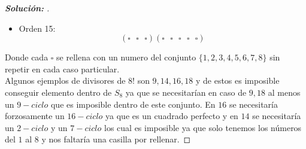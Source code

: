 \documentclass[12pt]{article}
\begin{document}
\begin{enumerate}
\begin{proof}[\textbf{Solución: }]
\begin{itemize}
    \item Orden 15:
    $$(\square\textbf{ }\square\textbf{ }\square)(\square\textbf{ }\square\textbf{ }\square\textbf{ }\square\textbf{ }\square)$$
\end{itemize}
Donde cada $\square$  se rellena con un numero del conjunto $\{1,2,3,4,5,6,7,8\}$ sin repetir en cada caso particular.\\
Algunos ejemplos de divisores de $8!$ son $9,14,16,18$ y de estos es imposible conseguir elemento dentro de $S_8$ ya que se necesitarían en caso de $9,18$ al menos un $9-ciclo$ que es imposible dentro de este conjunto. En $16$ se necesitaría forzosamente un $16-ciclo$ ya que es un cuadrado perfecto y en $14$ se necesitaría un $2-ciclo$ y un $7-ciclo$ los cual es imposible ya que solo tenemos los números del $1$ al $8$ y nos faltaría una casilla por rellenar.
    
\end{proof}
\end{enumerate}
\end{document}

